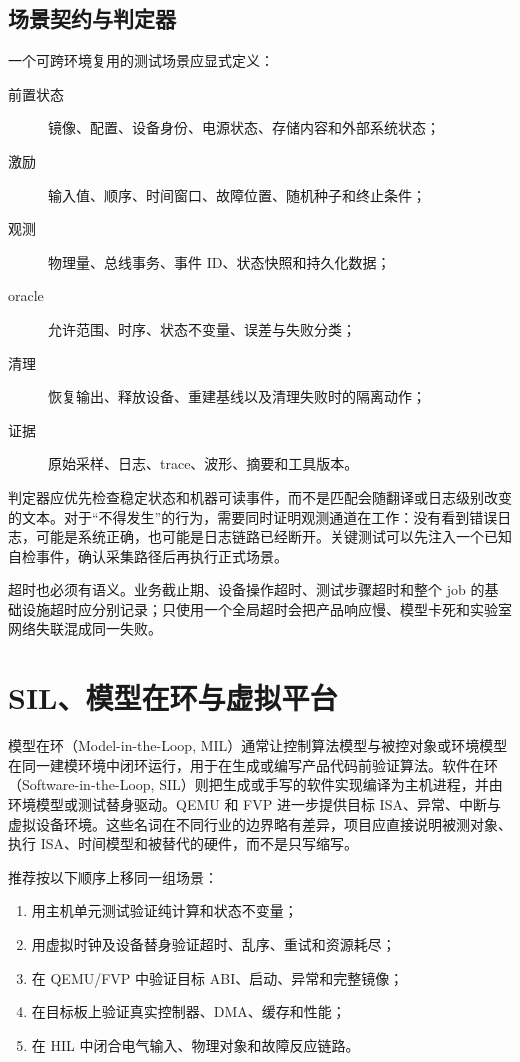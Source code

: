 \subsection{场景契约与判定器}

一个可跨环境复用的测试场景应显式定义：
\begin{description}
  \item[前置状态] 镜像、配置、设备身份、电源状态、存储内容和外部系统状态；
  \item[激励] 输入值、顺序、时间窗口、故障位置、随机种子和终止条件；
  \item[观测] 物理量、总线事务、事件 ID、状态快照和持久化数据；
  \item[oracle] 允许范围、时序、状态不变量、误差与失败分类；
  \item[清理] 恢复输出、释放设备、重建基线以及清理失败时的隔离动作；
  \item[证据] 原始采样、日志、trace、波形、摘要和工具版本。
\end{description}

判定器应优先检查稳定状态和机器可读事件，而不是匹配会随翻译或日志级别改变的文本。对于“不得发生”的行为，需要同时证明观测通道在工作：没有看到错误日志，可能是系统正确，也可能是日志链路已经断开。关键测试可以先注入一个已知自检事件，确认采集路径后再执行正式场景。

超时也必须有语义。业务截止期、设备操作超时、测试步骤超时和整个 job 的基础设施超时应分别记录；只使用一个全局超时会把产品响应慢、模型卡死和实验室网络失联混成同一失败。

\section{SIL、模型在环与虚拟平台}

模型在环（Model-in-the-Loop, MIL）通常让控制算法模型与被控对象或环境模型在同一建模环境中闭环运行，用于在生成或编写产品代码前验证算法。软件在环（Software-in-the-Loop, SIL）则把生成或手写的软件实现编译为主机进程，并由环境模型或测试替身驱动。QEMU 和 FVP 进一步提供目标 ISA、异常、中断与虚拟设备环境\cite{qemu-system-doc,arm-fvp-overview}。这些名词在不同行业的边界略有差异，项目应直接说明被测对象、执行 ISA、时间模型和被替代的硬件，而不是只写缩写。

推荐按以下顺序上移同一组场景：

\begin{enumerate}
  \item 用主机单元测试验证纯计算和状态不变量；
  \item 用虚拟时钟及设备替身验证超时、乱序、重试和资源耗尽；
  \item 在 QEMU/FVP 中验证目标 ABI、启动、异常和完整镜像；
  \item 在目标板上验证真实控制器、DMA、缓存和性能；
  \item 在 HIL 中闭合电气输入、物理对象和故障反应链路。
\end{enumerate}

